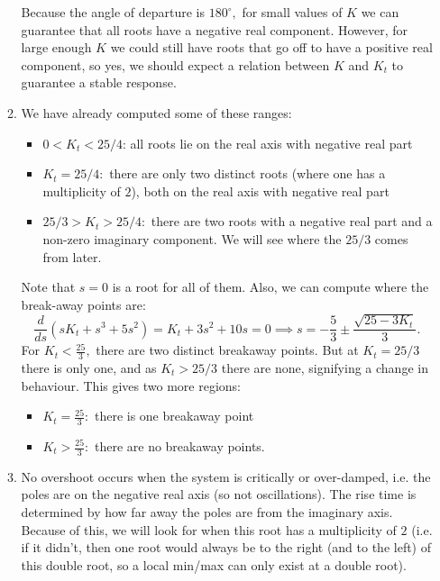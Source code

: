 \documentclass{article}
\begin{document}
\begin{enumerate}[label=\textbf{3.\arabic*}]
\begin{enumerate}[label=(\alph*)]
    Because the angle of departure is $180^\circ,$ for small values of $K$ we can guarantee that all roots have a negative real component. However, for large enough $K$ we could still have roots that go off to have a positive real component, so yes, we should expect a relation between $K$ and $K_t$ to guarantee a stable response.
    \item We have already computed some of these ranges:
    \begin{itemize}
        \item $0<K_t < 25/4$: all roots lie on the real axis with negative real part
        \item $K_t =25/4:$ there are only two distinct roots (where one has a multiplicity of $2$), both on the real axis with negative real part
        \item $25/3 > K_t > 25/4:$ there are two roots with a negative real part and a non-zero imaginary component. We will see where the $25/3$ comes from later.
    \end{itemize}
    Note that $s=0$ is a root for all of them. Also, we can compute where the break-away points are:
    \begin{equation}
        \frac{d}{ds}\left( sK_t + s^3 + 5s^2\right) = K_{t} + 3 s^{2} + 10 s = 0 \implies s = - \frac{5}{3} \pm \frac{\sqrt{25 - 3 K_{t}}}{3}.
    \end{equation}
    For $K_t < \frac{25}{3},$ there are two distinct breakaway points. But at $K_t = 25/3$ there is only one, and as $K_t > 25/3$ there are none, signifying a change in behaviour. This gives two more regions:
    \begin{itemize}
        \item $K_t = \frac{25}{3}:$ there is one breakaway point
        \item $K_t > \frac{25}{3}:$ there are no breakaway points.
    \end{itemize}
    \item No overshoot occurs when the system is critically or over-damped, i.e. the poles are on the negative real axis (so not oscillations). The rise time is determined by how far away the poles are from the imaginary axis. Because of this, we will look for when this root has a multiplicity of $2$ (i.e. if it didn't, then one root would always be to the right (and to the left) of this double root, so a local min/max can only exist at a double root).
    

\end{enumerate}
\end{enumerate}
\end{document}
